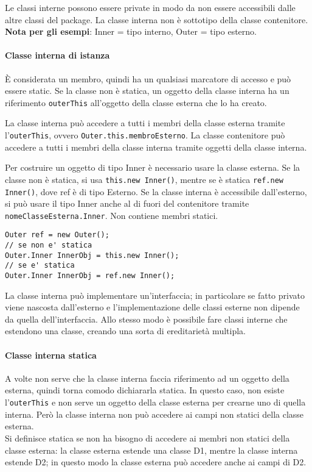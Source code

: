 Le classi interne possono essere private in modo da non essere accessibili dalle altre classi del package.
La classe interna non è sottotipo della classe contenitore. \\
\textbf{Nota per gli esempi}: Inner = tipo interno, Outer = tipo esterno.

\paragraph{Classe interna di istanza}
È considerata un membro, quindi ha un qualsiasi marcatore di accesso e può essere static. Se la classe non è statica, un oggetto della classe interna ha un riferimento \texttt{outerThis} all'oggetto della classe esterna che lo ha creato.

La classe interna può accedere a tutti i membri della classe esterna tramite l'\texttt{outerThis}, ovvero \texttt{Outer.this.membroEsterno}.
La classe contenitore può accedere a tutti i membri della classe interna tramite oggetti della classe interna.

Per costruire un oggetto di tipo Inner è necessario usare la classe esterna. Se la classe non è statica, si usa \texttt{this.new Inner()}, mentre se è statica \texttt{ref.new Inner()}, dove ref è di tipo Esterno.
Se la classe interna è accessibile dall'esterno, si può usare il tipo Inner anche al di fuori del contenitore tramite \texttt{nomeClasseEsterna.Inner}. 
Non contiene membri statici.
\vspace{2\parskip}
\begin{lstlisting}
Outer ref = new Outer();
// se non e' statica
Outer.Inner InnerObj = this.new Inner();
// se e' statica
Outer.Inner InnerObj = ref.new Inner();
\end{lstlisting}
La classe interna può implementare un'interfaccia; in particolare se fatto privato viene nascosta dall'esterno e l'implementazione delle classi esterne non dipende da quella dell'interfaccia. Allo stesso modo è possibile fare classi interne che estendono una classe, creando una sorta di ereditarietà multipla.

\paragraph{Classe interna statica} %
A volte non serve che la classe interna faccia riferimento ad un oggetto della esterna, quindi torna comodo dichiararla statica. In questo caso, non esiste l'\texttt{outerThis} e non serve un oggetto della classe esterna per crearne uno di quella interna. Però la classe interna non può accedere ai campi non statici della classe esterna.\\
Si definisce statica se non ha bisogno di accedere ai membri non statici della classe esterna: la classe esterna estende una classe D1, mentre la classe interna estende D2; in questo modo la classe esterna può accedere anche ai campi di D2.


